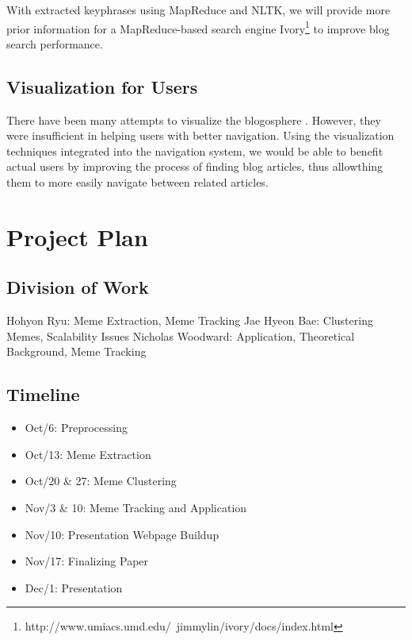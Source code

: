 \documentclass{sig-alternate}
\begin{document}
With extracted keyphrases using MapReduce and NLTK, we will provide more prior information for a MapReduce-based search engine Ivory\footnote{http://www.umiacs.umd.edu/~jimmylin/ivory/docs/index.html} to improve blog search performance.


\subsection{Visualization for Users}

There have been many attempts to visualize the blogosphere \cite{Tauro2008, Uchida2007}. However, they were insufficient in helping users with better navigation. Using the visualization techniques integrated into the navigation system, we would be able to benefit actual users by improving the process of finding blog articles, thus allowthing them to more easily navigate between related articles.


\section{Project Plan}

\subsection{Division of Work}

Hohyon Ryu: Meme Extraction, Meme Tracking
Jae Hyeon Bae: Clustering Memes, Scalability Issues
Nicholas Woodward: Application, Theoretical Background, Meme Tracking

\subsection{Timeline}


\begin{itemize}
  \item Oct/6: Preprocessing
  \item Oct/13: Meme Extraction
  \item Oct/20 \& 27: Meme Clustering
  \item Nov/3 \& 10: Meme Tracking and Application
  \item Nov/10: Presentation Webpage Buildup
  \item Nov/17: Finalizing Paper
  \item Dec/1: Presentation
\end{itemize}


%

\end{document}
